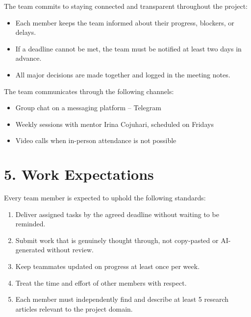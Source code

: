 \documentclass[12pt, a4paper]{article}
\begin{document}
The team commits to staying connected and transparent throughout the project:

\begin{itemize}[leftmargin=2em, label={--}]
    \item Each member keeps the team informed about their progress, blockers, or delays.
    \item If a deadline cannot be met, the team must be notified at least two days in advance.
    \item All major decisions are made together and logged in the meeting notes.
\end{itemize}

The team communicates through the following channels:

\begin{itemize}[leftmargin=2em, label={--}]
    \item Group chat on a messaging platform -- Telegram
    \item Weekly sessions with mentor Irina Cojuhari, scheduled on Fridays
    \item Video calls when in-person attendance is not possible
\end{itemize}

\section{5. Work Expectations}

Every team member is expected to uphold the following standards:

\begin{enumerate}[leftmargin=2em]
    \item Deliver assigned tasks by the agreed deadline without waiting to be reminded.
    \item Submit work that is genuinely thought through, not copy-pasted or AI-generated without review.
    \item Keep teammates updated on progress at least once per week.
    \item Treat the time and effort of other members with respect.
    \item Each member must independently find and describe at least 5 research articles relevant to the project domain.
\end{enumerate}

\end{document}

